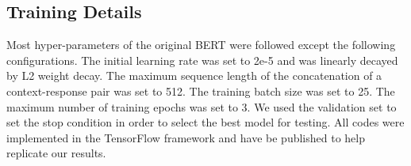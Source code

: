 \documentclass[sigconf]{acmart}
\begin{document}
  \subsection{Training Details}
    Most hyper-parameters of the original BERT were followed \cite{DBLP:conf/naacl/DevlinCLT19} except the following configurations.
The initial learning rate was set to 2e-5 and was linearly decayed by L2 weight decay.
    The maximum sequence length of the concatenation of a context-response pair was set to 512.
    The training batch size was set to 25.
    The maximum number of training epochs was set to 3.
We used the validation set to set the stop condition in order to select the best model for testing.
    All codes were implemented in the TensorFlow framework \cite{DBLP:conf/osdi/AbadiBCCDDDGIIK16} and have be published to help replicate our results.
\end{document}
